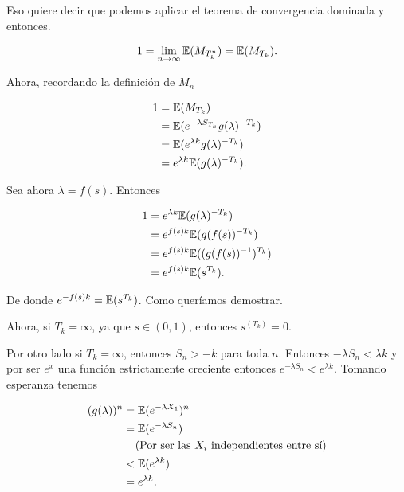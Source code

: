     Eso quiere decir que podemos aplicar el teorema de convergencia dominada y entonces.
    
    \begin{align}
        1 = \lim_{n \rightarrow \infty} \mathbb{E}(M_{T_k^n}) = \mathbb{E}(M_{T_k}).
    \end{align}\par\null
        
    Ahora, recordando la definición de $M_n$
    
    \begin{align}
       1    &=  \mathbb{E}(M_{T_k})                                 \\
            &=  \mathbb{E}(e^{-\lambda S_{T_k}} g(\lambda)^{-T_k})  \\
            &=  \mathbb{E}(e^{\lambda k} g(\lambda)^{-T_k})         \\
            &=  e^{\lambda k} \mathbb{E}(g(\lambda)^{-T_k}).        
    \end{align}\par\null
    
    Sea ahora $\lambda = f(s)$. Entonces
    
    \begin{align}
        1   &=  e^{\lambda k} \mathbb{E}(g(\lambda)^{-T_k})        \\
            &=  e^{f(s) k} \mathbb{E}(g(f(s))^{-T_k})              \\
            &=  e^{f(s) k} \mathbb{E}((g(f(s))^{-1})^{T_k})        \\            
            &=  e^{f(s) k} \mathbb{E}(s^{T_k}).                 
    \end{align}\par\null
    
    De donde $e^{-f(s) k} = \mathbb{E}(s^{T_k})$. Como queríamos demostrar.\par\null
    
    Ahora, si $T_k = \infty$, ya que $s \in (0,1)$, entonces $s^(T_k) = 0$.\par\null
    
    Por otro lado si $T_k = \infty$, entonces $S_n > -k$ para toda $n$. Entonces
    $-\lambda S_n < \lambda k$ y por ser $e^x$ una función estrictamente creciente entonces
    $e^{-\lambda S_n} < e^{\lambda k}$. Tomando esperanza tenemos
    
    \begin{align}
            (g(\lambda))^n      &=  \mathbb{E}(e^{-\lambda X_1})^{n}                                    \\ 
                                &=  \mathbb{E}(e^{-\lambda S_n})                                        \\
                                &\;\;\;\;\mbox{(Por ser las $X_i$ independientes entre sí)}     \\
                                &<  \mathbb{E}(e^{\lambda k})                                           \\
                                &=   e^{\lambda k}.
    \end{align}
    

